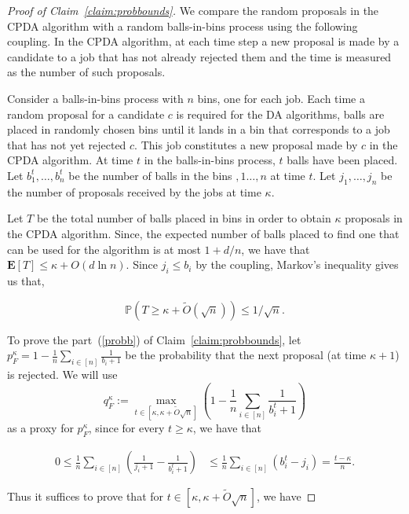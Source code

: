 \documentclass[11pt]{amsart}
\begin{document}
\begin{proof}[Proof of Claim~\ref{claim:probbounds}]

We compare the random proposals in the CPDA algorithm with a random balls-in-bins process using the following coupling.  In the CPDA algorithm, at each time step a new proposal is made by a candidate to a job that has not already rejected them and the time is measured as the number of such proposals.  


Consider a balls-in-bins process with $n$ bins, one for each job. Each time a random proposal for a candidate $c$ is required for the DA algorithms, balls are placed in randomly chosen bins until it lands in a bin that corresponds to a job that has not yet rejected $c$. This job constitutes a new proposal made by $c$ in the CPDA algorithm. At time $t$ in the balls-in-bins process, $t$ balls have been placed. Let $b_1^{t},\ldots, b_n^{t}$ be the number of  balls in the bins $,1 \ldots, n$ at time $t$. Let $j_1,\ldots,j_n$ be the number of proposals received by the jobs at time $\kappa$.

Let $T$ be the total number of balls placed in bins in order to obtain $\kappa$ proposals in the CPDA algorithm. Since, the expected number of balls placed to find one that can be used for the algorithm is at most $1 + d/n$, we have that $\mathbf{E}[T] \leq \kappa + O(d\ln n)$. Since $j_i \leq b_i$ by the coupling, Markov's inequality gives us that,

\begin{equation}\label{eqn:sumb_i}
\mathbb{P}\left(T \geq \kappa + \tilde{O}(\sqrt{n})\right) \leq 1/\sqrt{n}.
\end{equation}



To prove the part~(\ref{probb}) of Claim~\ref{claim:probbounds}, let $p_F^{\kappa} = 1 - \frac{1}{n}\sum_{i\in [n]}\frac{1}{b_i + 1}$ be the probability that the next proposal (at time $\kappa + 1$) is rejected. We will use 
\[
q_F^{\kappa} := \max_{t \in [\kappa, \kappa + \tilde{O}{\sqrt{n}}]}\left(1 - \frac{1}{n}\sum_{i\in [n]}\frac{1}{b_i^t + 1}\right)
\]
as a proxy for $p_F^{\kappa}$, since for every $t \geq \kappa$, we have that

\begin{align*}
0\leq \frac{1}{n}\sum_{i \in [n]}\left(\frac{1}{j_i + 1} - \frac{1}{b_i^t + 1}\right) & \leq \frac{1}{n}\sum_{i \in [n]}(b_i^t - j_i) = \frac{t - \kappa}{n}.
\end{align*}


Thus it suffices to prove that for $t \in [\kappa, \kappa + \tilde{O}{\sqrt{n}}]$, we have




\end{proof}
\end{document}
